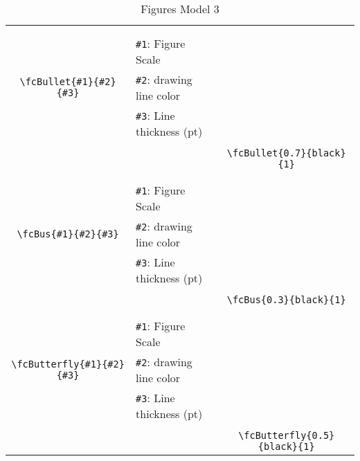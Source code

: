 \documentclass{article}
\begin{document}
\begin{table}[H]
\begin{tabular}{|c|l|c|}
	&&\multirow{5}{*}{\fcBullet{0.7}{black}{1}}\\	&&\\	&\verb|#1|: Figure Scale &\\	\verb|\fcBullet{#1}{#2}{#3}|&	\verb|#2|: drawing line color &\\	&\verb|#3|: Line thickness (pt) &\\ &&\\&&	\verb|\fcBullet{0.7}{black}{1}|\\\hline 	
	&&\multirow{5}{*}{\fcBus{0.3}{black}{1}}\\	&&\\	&\verb|#1|: Figure Scale &\\	\verb|\fcBus{#1}{#2}{#3}|&	\verb|#2|: drawing line color &\\	&\verb|#3|: Line thickness (pt) &\\ &&\\&&	\verb|\fcBus{0.3}{black}{1}|\\\hline 	
	&&\multirow{5}{*}{\fcButterfly{0.5}{black}{1}}\\	&&\\	&\verb|#1|: Figure Scale &\\	\verb|\fcButterfly{#1}{#2}{#3}|&	\verb|#2|: drawing line color &\\	&\verb|#3|: Line thickness (pt) &\\ &&\\&&	\verb|\fcButterfly{0.5}{black}{1}|\\\hline 	\hline\end{tabular}\caption{Figures Model 3}\label{tab3}\end{table}
\end{document}
